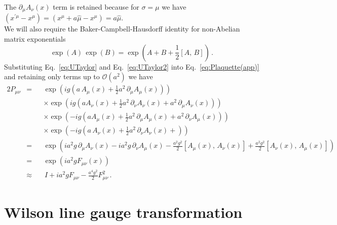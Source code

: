 %
The $\partial_\mu A_\nu (x)$ term is retained because for $\sigma = \mu$ we have $(x^{\prime\mu} - x^\mu) = (x^\mu + a\hat{\mu} - x^\mu) = a\hat{\mu}$.\\

We will also require the Baker-Campbell-Hausdorff identity for non-Abelian matrix exponentials
%
\begin{equation}
\exp(A)\,\exp(B) = \exp\left(A + B +\frac{1}{2}[A,\,B]\right)\, .
\end{equation}
%
Substituting Eq.~\ref{eq:UTaylor} and Eq.~\ref{eq:UTaylor2} into Eq.~\ref{eq:Plaquette(app)} and retaining only terms up to $\mathcal{O}(a^2)$ we have
%
\begin{alignat*}{2}
P_{\mu\nu} &= &&\exp\left(ig\left(a\,A_\mu(x)+\frac{1}{2}a^2\,\partial_\mu A_\mu(x) \right)\right)\\
& &&\times\exp\left(ig\left(aA_\nu(x) + \frac{1}{2}a^2\,\partial_\nu A_\nu(x) + a^2\,\partial_\mu A_\nu(x)\right)\right)\\
& &&\times\exp\left(-ig\left(aA_\mu(x) + \frac{1}{2}a^2\,\partial_\mu A_\mu(x) + a^2\,\partial_\nu A_\mu(x)\right)\right)\\
& &&\times\exp\left(-ig\left(a\,A_\nu(x)+\frac{1}{2}a^2\,\partial_\nu A_\nu(x) + \right)\right)\\
&= &&\exp\left(ia^2g\,\partial_\mu A_\nu(x) - ia^2g\,\partial_\nu A_\mu(x) -\frac{a^2g^2}{2}[A_\mu(x),\,A_\nu(x)] + \frac{a^2g^2}{2}[A_\nu(x),\,A_\mu(x)]\right)\\
&= &&\exp\left(ia^2g F_{\mu\nu}(x)\right)\\
&\approx &&\, I + ia^2 g F_{\mu\nu} -\frac{a^4 g^2}{2} F_{\mu\nu}^2\, .
\end{alignat*}

\section{Wilson line gauge transformation}\label{app:WilsonLineGT}

